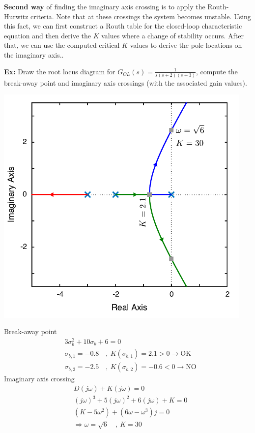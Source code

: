 \documentclass[twoside]{article}
\begin{document}
\begin{enumerate}
\textbf{Second way} of finding the imaginary axis crossing is to
apply the Routh-Hurwitz criteria. Note that at these crossings the 
system becomes unstable. Using this fact, we can first construct a 
Routh table for the closed-loop characteristic equation and then 
derive the $K$ values where a change of stability occurs. After that, we can
use the computed critical $K$ values to derive the pole locations
on the imaginary axis..

\vspace{6pt}

\textbf{Ex:} Draw the root locus diagram for $G_{OL}(s) = \frac{1}{s (s+2) (s+3)}$,
compute the break-away point and imaginary axis crossings 
(with the associated gain values).

\vspace{12pt}

\begin{minipage}[h]{0.55\linewidth}
    \begin{center}
      \includegraphics[width=0.95\textwidth]{imag}
    \end{center}
\end{minipage}
\begin{minipage}[h]{0.45\linewidth}
	Break-away point
	\begin{align*}
	& 3 \sigma_{b}^2 + 10 \sigma_b + 6 = 0 
	\\
	& \sigma_{b,1} = - 0.8  \quad , \ K(\sigma_{b,1}) = 2.1 > 0 \rightarrow \mathrm{OK}
	\\
	& \sigma_{b,2} =  -2.5 \quad , \ K(\sigma_{b,2}) = -0.6 < 0 \rightarrow \mathrm{NO}
	\end{align*}
	Imaginary axis crossing
	\begin{align*}
	& D(j \omega) + K (j \omega) = 0 \\ 	 
	& (j \omega)^3 + 5 (j \omega)^2 + 6 (j \omega) + K = 0 \\ 
	& (K - 5 \omega^2) + (6 \omega - \omega^3) j  = 0
	\\ & \Rightarrow \omega = \sqrt{6}  \quad , \ K = 30
	\end{align*}
\end{minipage}


\end{enumerate}
\end{document}
